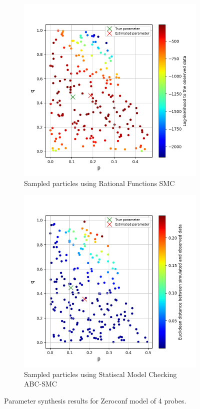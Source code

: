 \begin{figure}[H]
    \centering
    \begin{subfigure}{0.48\textwidth}
        \centering
        \includegraphics[width=\linewidth]{figures/zeroconf4_rf.png}
        \caption{Sampled particles using Rational Functions SMC}
    \end{subfigure}
    \hfill
    \begin{subfigure}{0.48\textwidth}
        \centering
        \includegraphics[width=\linewidth]{figures/zeroconf4_sim.png}
        \caption{Sampled particles using Statiscal Model Checking ABC-SMC}
    \end{subfigure}
    \caption{Parameter synthesis results for Zeroconf model of 4 probes.}
\end{figure}

